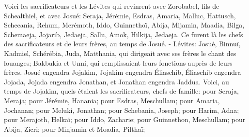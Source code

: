 \verse Voici les sacrificateurs et les Lévites qui revinrent avec Zorobabel, fils de Schealthiel, et avec Josué: Seraja, Jérémie, Esdras, 
\verse Amaria, Malluc, Hattusch, 
\verse Schecania, Rehum, Merémoth, 
\verse Iddo, Guinnethoï, Abija, 
\verse Mijamin, Maadia, Bilga, 
\verse Schemaeja, Jojarib, Jedaeja, 
\verse Sallu, Amok, Hilkija, Jedaeja. Ce furent là les chefs des sacrificateurs et de leurs frères, au temps de Josué. - 
\verse Lévites: Josué, Binnuï, Kadmiel, Schérébia, Juda, Matthania, qui dirigeait avec ses frères le chant des louanges; 
\verse Bakbukia et Unni, qui remplissaient leurs fonctions auprès de leurs frères. 
\verse Josué engendra Jojakim, Jojakim engendra Éliaschib, Éliaschib engendra Jojada, 
\verse Jojada engendra Jonathan, et Jonathan engendra Jaddua. 
\verse Voici, au temps de Jojakim, quels étaient les sacrificateurs, chefs de famille: pour Seraja, Meraja; pour Jérémie, Hanania; 
\verse pour Esdras, Meschullam; pour Amaria, Jochanan; 
\verse pour Meluki, Jonathan; pour Schebania, Joseph; 
\verse pour Harim, Adna; pour Merajoth, Helkaï; 
\verse pour Iddo, Zacharie; pour Guinnethon, Meschullam; 
\verse pour Abija, Zicri; pour Minjamin et Moadia, Pilthaï; 

